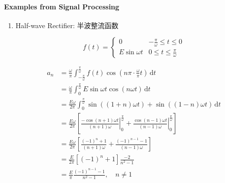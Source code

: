 
\paragraph{Examples from Signal Processing}

\begin{enumerate}
    \item Half-wave Rectifier: 半波整流函数

          $$f(t)=\begin{cases}
                  0             & -\frac{\pi}{\omega}\leq t\leq 0 \\
                  E\sin\omega t & 0\leq t\leq \frac{\pi}{\omega}
              \end{cases}$$

          \begin{align*}
              a_n
               & =\frac{\omega}{\pi}\int_{-\frac{\pi}{\omega}}^{\frac{\pi}{\omega}}f(t)\cos\left(n\pi\cdot\frac{\omega}{\pi}t\right)\,\mathrm{d}t                                                       \\
               & =\frac{\omega}{\pi}\int_0^{\frac{\pi}{\omega}}E\sin\omega t\cos(n\omega t)\,\mathrm{d}t                                                                                                \\
               & =\frac{E\omega}{2\pi}\int_0^{\frac{\pi}{\omega}}\sin\left((1+n)\omega t\right)+\sin\left((1-n)\omega t\right)\,\mathrm{d}t                                                             \\
               & =\frac{E\omega}{2\pi}\left[\left.\frac{-\cos(n+1)\omega t}{(n+1)\omega}\right|_0^{\frac{\pi}{\omega}}+\left.\frac{\cos(n-1)\omega t}{(n-1)\omega}\right|_0^{\frac{\pi}{\omega}}\right] \\
               & =\frac{E\omega}{2\pi}\left[\frac{(-1)^n+1}{(n+1)\omega}+\frac{(-1)^{n-1}-1}{(n-1)\omega}\right]                                                                                        \\
               & =\frac{E}{2\pi}\left[(-1)^n+1\right]\frac{-2}{n^2-1}                                                                                                                                   \\
               & =\frac{E}{\pi}\frac{(-1)^{n-1}-1}{n^2-1},\quad n\neq 1                                                                                                                                 \\

\end{align*}
\end{enumerate}
